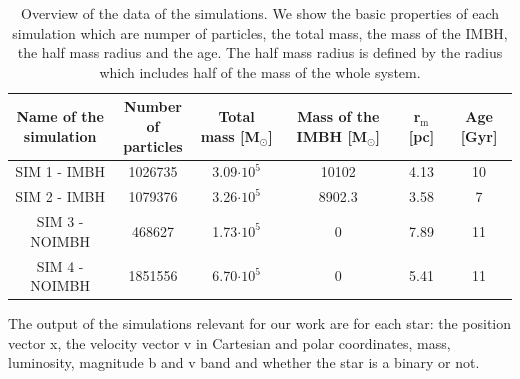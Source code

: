 \begin{table}[htbp]
\centering
\begin{tabular}{ c | c | c | c | c | c }
\makecell{Name of the \\simulation} & \makecell{Number of \\ particles} & Total mass [M\(_\odot\)]& \makecell{Mass of the \\ \ac{IMBH} [M\(_\odot\)]}& r\(_\mathrm{m}\) [pc] & Age [Gyr]\\
\hline			
  SIM 1 - IMBH & 1026735 & 3.09\(\cdot 10^5\) & 10102 & 4.13 & 10\\
  SIM 2 - IMBH & 1079376& 3.26\(\cdot 10^5\) & 8902.3 & 3.58 & 7\\
  SIM 3 - NOIMBH & 468627& 1.73\(\cdot 10^5\)& 0 & 7.89 & 11\\
  SIM 4 - NOIMBH & 1851556& 6.70\(\cdot 10^5\)& 0 & 5.41 & 11\\

\end{tabular}
\caption{Overview of the data of the simulations. We show the basic properties of each simulation which are numper of particles, the total mass, the mass of the \ac{IMBH}, the half mass radius and the age. The half mass radius is defined by the radius which includes half of the mass of the whole system.}
\label{tab:overview_simulation}
\end{table}

The output of the simulations relevant for our work are for each star: the position
vector x, the velocity vector v in Cartesian and polar coordinates, mass, luminosity, magnitude b and v band and whether
the star is a binary or not.

